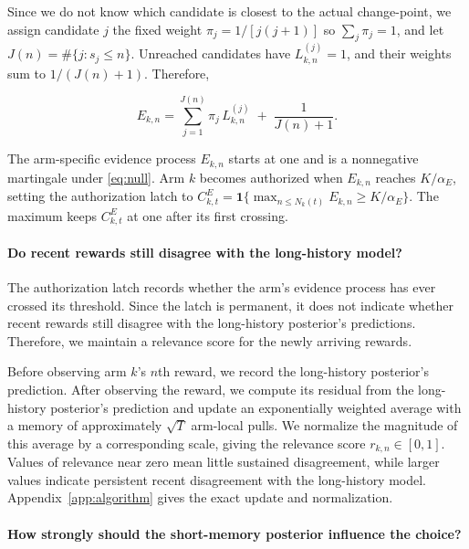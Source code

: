 \documentclass{article}
\newcommand{\1}{\mathbf 1}
\begin{document}
Since we do not know which candidate is closest to the actual change-point,
we assign candidate $j$ the fixed weight
$\pi_j=1/[j(j+1)]$ so
$\sum_j\pi_j=1$, and let $J(n)=\#\{j:s_j\le n\}$.
Unreached candidates have $L_{k,n}^{(j)}=1$, and their weights sum to
$1/(J(n)+1)$.
Therefore,

\begin{equation}
 E_{k,n}=\sum_{j=1}^{J(n)}\pi_j\,L_{k,n}^{(j)}
 \;+\;\frac{1}{J(n)+1}.
 \label{eq:monitor}
\end{equation}

The arm-specific evidence process $E_{k,n}$ starts at one and is a nonnegative martingale under \eqref{eq:null}. Arm $k$ becomes authorized when $E_{k,n}$ reaches $K/\alpha_E$, setting the authorization latch to $C^E_{k,t}=\1\{\max_{n\le N_k(t)}E_{k,n}\ge K/\alpha_E\}$.
The maximum keeps $C^E_{k,t}$ at one after its first crossing.

\paragraph{Do recent rewards still disagree with the long-history model?}

The authorization latch records whether the arm's evidence process has ever
crossed its threshold. Since the latch is permanent, it does not indicate
whether recent rewards still disagree with the long-history posterior's predictions. Therefore, we maintain a relevance score for the newly arriving rewards.

Before observing arm $k$'s $n$th reward, we record the long-history
posterior's prediction.
After observing the reward, we compute its residual
from the long-history posterior's prediction and update an exponentially weighted average with a memory of approximately $\sqrt T$ arm-local pulls.
We normalize the magnitude of this average by a corresponding scale, giving the relevance score $r_{k,n}\in[0,1]$.
Values of relevance near zero mean little sustained disagreement, while larger values indicate persistent recent disagreement
with the long-history model. Appendix~\ref{app:algorithm} gives the exact update and normalization.

\paragraph{How strongly should the short-memory posterior influence the choice?}
\end{document}
